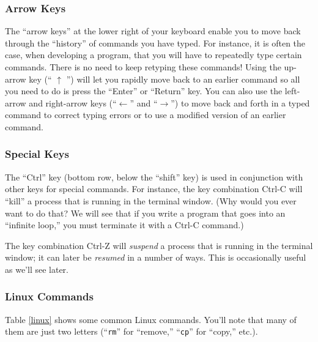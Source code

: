 \subsubsection*{Arrow Keys}
\vspace{-0.1in}
The ``arrow keys'' at the lower right of your keyboard enable you to
move back through the ``history'' of commands you have typed. For instance,
it is often the case, when developing a program, that you will
have to repeatedly type certain commands. There is no need to keep retyping these
commands! Using the up-arrow key (`` $\uparrow$ '') will let you rapidly
move back to an earlier command so all you need to do is press the 
``Enter'' or ``Return'' key. You can also use the left-arrow and 
right-arrow keys (``$\leftarrow$'' and ``$\rightarrow$'') to move back
and forth in a typed command to correct typing errors or to use a
modified version of an earlier command. 

\subsubsection*{Special Keys}
\vspace{-0.1in}
The ``Ctrl'' key (bottom row, below the ``shift'' key) is used in
conjunction with other keys for special commands. For
instance, the key combination Ctrl-C will ``kill'' a process that is
running in the terminal window. (Why would you ever want to do that?
We will see that if you write a program that goes into an ``infinite
loop,'' you must terminate it with a Ctrl-C command.)

\noindent The key combination Ctrl-Z will {\em suspend} a process that is
running in the terminal window; it can later be {\em resumed} in a
number of ways. This is occasionally useful as we'll see later.


\subsubsection*{Linux Commands}
\vspace{-0.1in}
Table \ref{linux} shows some common Linux commands. You'll note 
that many of them are just two letters (``{\tt rm}'' for ``remove,''
``{\tt cp}'' for ``copy,'' etc.). 

